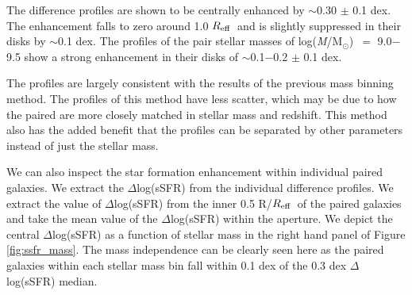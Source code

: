 \documentclass[iop,revtex4,twocolumn,apj,numberedappendix,appendixfloats]{emulateapj}
\newcommand{\reff}{$R_{\rm eff}$}
\newcommand{\logm}{log({\it M}/M$_{\odot}$)}
\begin{document}
The difference profiles are shown to be centrally enhanced by $\sim$0.30 $\pm$ 0.1 dex. The enhancement falls to zero around 1.0 \reff\ and is slightly suppressed in their disks by $\sim$0.1 dex. The profiles of the pair stellar masses of \logm\ $=$ 9.0$-$9.5 show a strong enhancement in their disks of $\sim$0.1$-$0.2 $\pm$ 0.1 dex.

The profiles are largely consistent with the results of the previous mass binning method. The profiles of this method have less scatter, which may be due to how the paired are more closely matched in stellar mass and redshift. This method also has the added benefit that the profiles can be separated by other parameters instead of just the stellar mass. 

We can also inspect the star formation enhancement within individual paired galaxies. We extract the $\Delta$log(sSFR) from the individual difference profiles. We extract the value of $\Delta$log(sSFR) from the inner 0.5 R/\reff\ of the paired galaxies and take the mean value of the $\Delta$log(sSFR) within the aperture. We depict the central $\Delta$log(sSFR) as a function of stellar mass in the right hand panel of Figure \ref{fig:ssfr_mass}. The mass independence can be clearly seen here as the paired galaxies within each stellar mass bin fall within 0.1 dex of the 0.3 dex $\Delta$log(sSFR) median. 
\end{document}
